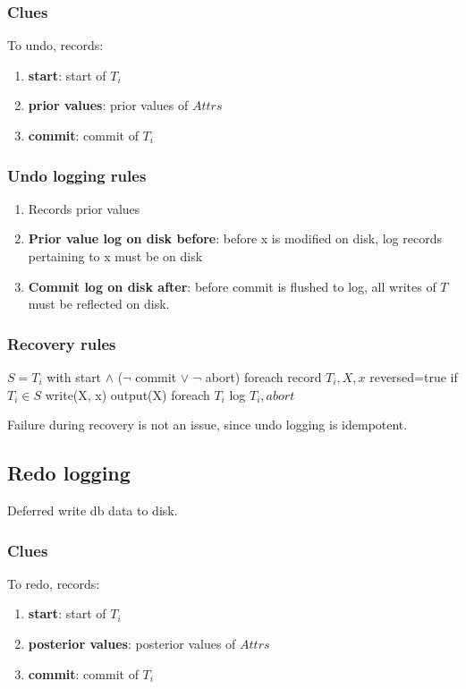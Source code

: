 \documentclass[a4paper]{report}
\begin{document}
\subsubsection{Clues}
To undo, records: 
\begin{enumerate}
\item \textbf{start}: start of $T_i$
\item \textbf{prior values}: prior values of $Attrs$
\item \textbf{commit}: commit of $T_i$
\end{enumerate}

\subsubsection{Undo logging rules}
\begin{enumerate}
\item Records prior values
\item \textbf{Prior value log on disk before}: before x is modified on disk, log records pertaining to x must be on disk
\item \textbf{Commit log on disk after}: before commit is flushed to log, all writes of $T$ must be reflected on disk.
\end{enumerate}

\newpage
\subsubsection{Recovery rules}
\begin{pseudo}
$S = T_i$ with start $\wedge$ ($\neg$ commit $\vee$ $\neg$ abort)
foreach record $T_i, X, x$ reversed=true
  if $T_i \in S$
    write(X, x) 
    output(X)
foreach $T_i$
  log $T_i, abort$
\end{pseudo}
Failure during recovery is not an issue, since undo logging is idempotent.



\subsection{Redo logging}
Deferred write db data to disk. 
\subsubsection{Clues}
To redo, records: 
\begin{enumerate}
\item \textbf{start}: start of $T_i$
\item \textbf{posterior values}: posterior values of $Attrs$
\item \textbf{commit}: commit of $T_i$
\end{enumerate}
\end{document}
